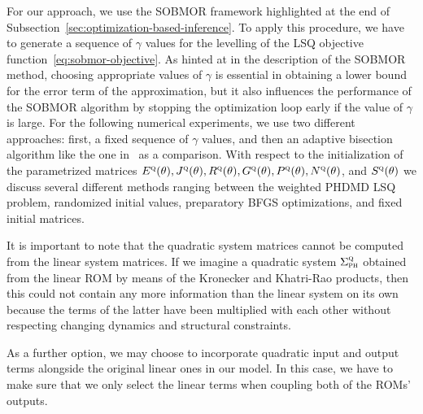 
For our approach, we use the \ac{SOBMOR} framework highlighted at the end of Subsection~\ref{sec:optimization-based-inference}.
To apply this procedure, we have to generate a sequence of $\gamma$ values for the levelling of the \ac{LSQ} objective function~\eqref{eq:sobmor-objective}.
As hinted at in the description of the \ac{SOBMOR} method, choosing appropriate values of $\gamma$ is essential in obtaining a lower bound for the error term of the approximation, but it also influences the performance of the \ac{SOBMOR} algorithm by stopping the optimization loop early if the value of $\gamma$ is large.
For the following numerical experiments, we use two different approaches: first, a fixed sequence of $\gamma$ values, and then an adaptive bisection algorithm like the one in~\cite{SV2021} as a comparison.
With respect to the initialization of the parametrized matrices $E^{\textnormal{\scshape q}}(\theta), J^{\textnormal{\scshape q}}(\theta), R^{\textnormal{\scshape q}}(\theta), G^{\textnormal{\scshape q}}(\theta), P^{\textnormal{\scshape q}}(\theta), N^{\textnormal{\scshape q}}(\theta)$, and $S^{\textnormal{\scshape q}}(\theta)$ we discuss several different methods ranging between the weighted \ac{PHDMD} \ac{LSQ} problem, randomized initial values, preparatory \ac{BFGS} optimizations, and fixed initial matrices.

It is important to note that the quadratic system matrices cannot be computed from the linear system matrices.
If we imagine a quadratic system $\Sigma_{\textnormal{\scshape ph}}^{\textnormal{\scshape q}}$ obtained from the linear \ac{ROM} by means of the Kronecker and Khatri-Rao products, then this could not contain any more information than the linear system on its own because the terms of the latter have been multiplied with each other without respecting changing dynamics and structural constraints.

As a further option, we may choose to incorporate quadratic input and output terms alongside the original linear ones in our model.
In this case, we have to make sure that we only select the linear terms when coupling both of the \acp{ROM}' outputs.
